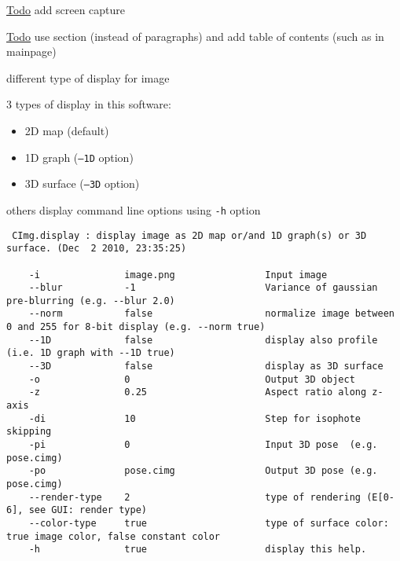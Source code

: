 \begin{Desc}
\item[\hyperlink{todo__todo000001}{Todo}]add screen capture \end{Desc}
\begin{Desc}
\item[\hyperlink{todo__todo000001}{Todo}]use section (instead of paragraphs) and add table of contents (such as in mainpage)\end{Desc}
\begin{Desc}
\item[different type of display for image]\end{Desc}
3 types of display in this software: \begin{itemize}
\item 2D map (default) \item 1D graph ({\tt --1D} option) \item 3D surface ({\tt --3D} option)\end{itemize}
others display command line options using {\tt -h} option 

\begin{VerbInclude}\begin{verbatim}
 CImg.display : display image as 2D map or/and 1D graph(s) or 3D surface. (Dec  2 2010, 23:35:25)

    -i               image.png                Input image
    --blur           -1                       Variance of gaussian pre-blurring (e.g. --blur 2.0)
    --norm           false                    normalize image between 0 and 255 for 8-bit display (e.g. --norm true)
    --1D             false                    display also profile (i.e. 1D graph with --1D true)
    --3D             false                    display as 3D surface
    -o               0                        Output 3D object
    -z               0.25                     Aspect ratio along z-axis
    -di              10                       Step for isophote skipping
    -pi              0                        Input 3D pose  (e.g. pose.cimg)
    -po              pose.cimg                Output 3D pose (e.g. pose.cimg)
    --render-type    2                        type of rendering (E[0-6], see GUI: render type)
    --color-type     true                     type of surface color: true image color, false constant color
    -h               true                     display this help.
\end{verbatim}
\end{VerbInclude}


